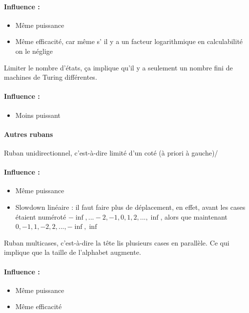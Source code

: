 \paragraph{Influence :} 
\begin{itemize}
	\item Même puissance
	\item Même efficacité, car même s’ il y a un facteur logarithmique en 
		calculabilité on le néglige
\end{itemize}

Limiter le nombre d'états, ça implique qu'il y a seulement un nombre fini de 
machines de Turing différentes.

\paragraph{Influence :} 
\begin{itemize}
	\item Moins puissant
\end{itemize}

\paragraph{Autres rubans}

Ruban unidirectionnel, c'est-à-dire limité d'un coté (à priori à gauche)/

\paragraph{Influence :} 
\begin{itemize}
	\item Même puissance
	\item Slowdown linéaire : il faut faire plus de déplacement, en 
		effet, avant les cases étaient numéroté 
		$-\inf,...-2,-1,0,1,2,...,\inf$, alors que maintenant
	       	$0,-1,1,-2,2,...,-\inf,\inf$ 
\end{itemize}

Ruban multicases, c'est-à-dire la tête lis plusieurs cases en parallèle. Ce qui 
implique que la taille de l'alphabet augmente.

\paragraph{Influence :} 
\begin{itemize}
	\item Même puissance
	\item Même efficacité
\end{itemize}

